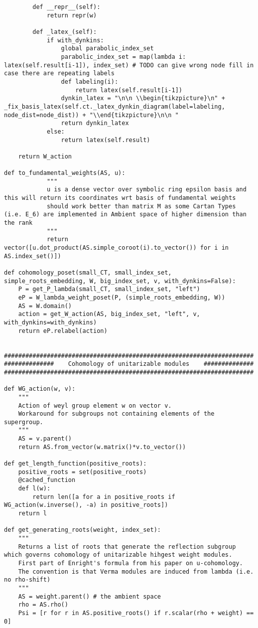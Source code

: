 \begin{verbatim}
        def __repr__(self):
            return repr(w)

        def _latex_(self):
            if with_dynkins:
                global parabolic_index_set
                parabolic_index_set = map(lambda i: latex(self.result[i-1]), index_set) # TODO can give wrong node fill in case there are repeating labels
                def labeling(i):
                    return latex(self.result[i-1])
                dynkin_latex = "\n\n \\begin{tikzpicture}\n" + _fix_basis_latex(self.ct._latex_dynkin_diagram(label=labeling, node_dist=node_dist)) + "\\end{tikzpicture}\n\n "
                return dynkin_latex
            else:
                return latex(self.result)

    return W_action

def to_fundamental_weights(AS, u):
            """
            u is a dense vector over symbolic ring epsilon basis and this will return its coordinates wrt basis of fundamental weights
            should work better than matrix M as some Cartan Types (i.e. E_6) are implemented in Ambient space of higher dimension than the rank
            """
            return vector([u.dot_product(AS.simple_coroot(i).to_vector()) for i in AS.index_set()])

def cohomology_poset(small_CT, small_index_set, simple_roots_embedding, W, big_index_set, v, with_dynkins=False):
    P = get_P_lambda(small_CT, small_index_set, "left")
    eP = W_lambda_weight_poset(P, (simple_roots_embedding, W))
    AS = W.domain()
    action = get_W_action(AS, big_index_set, "left", v, with_dynkins=with_dynkins)
    return eP.relabel(action)


######################################################################
##############    Cohomology of unitarizable modules    ##############
######################################################################

def WG_action(w, v):
    """
    Action of weyl group element w on vector v.
    Workaround for subgroups not containing elements of the supergroup.
    """
    AS = v.parent()
    return AS.from_vector(w.matrix()*v.to_vector())

def get_length_function(positive_roots):
    positive_roots = set(positive_roots)
    @cached_function
    def l(w):
        return len([a for a in positive_roots if WG_action(w.inverse(), -a) in positive_roots])
    return l

def get_generating_roots(weight, index_set):
    """
    Returns a list of roots that generate the reflection subgroup which governs cohomology of unitarizable hihgest weight modules.
    First part of Enright's formula from his paper on u-cohomology.
    The convention is that Verma modules are induced from lambda (i.e. no rho-shift)
    """
    AS = weight.parent() # the ambient space
    rho = AS.rho()
    Psi = [r for r in AS.positive_roots() if r.scalar(rho + weight) == 0]


\end{verbatim}
